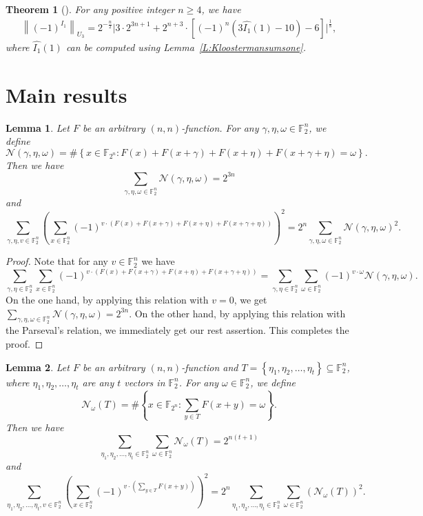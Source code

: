 \documentclass[12 pt]{article}
\newtheorem{theorem}{Theorem}
\newtheorem{lemma}{Lemma}
\def\F{{\mathbb F}}
\begin{document}
  \begin{theorem}[\cite{InverseFuncDAM2021}]\label{T:FFTSolution}
  For any positive integer {$n\geq 4$}, we have
  \begin{eqnarray*}
  \left\| (-1)^{I_1}\right\| _{U_3}=2^{-{\frac n2}}\bigg|3\cdot2^{3n+1}+2^{n+3}\cdot\left[(-1)^n\left(3\widehat{I_1}(1)-10\right)-6\right]\bigg|^{\frac 18},
  \end{eqnarray*}
  where $\widehat{I_1}(1)$ can be computed using Lemma~\ref{L:Kloostermansumsone}.
  \end{theorem}
\section{Main results}
  \begin{lemma}\label{L:SumSqur}
  Let $F$ be an arbitrary $(n, n)$-function. For any $\gamma,\eta,\omega\in\F_2^n$, we define
  \[\mathcal{N}(\gamma,\eta,\omega)=\#\left\{x\in\F_{2^n} : F(x)+F(x+\gamma)+F(x+\eta)+F(x+\gamma+\eta)=\omega\right\}.\]
  Then we have
  \[\sum_{\gamma,\eta,\omega\in\F_2^n}\mathcal{N}(\gamma,\eta,\omega)=2^{3n}\]
  and
  \[\sum_{\gamma,\eta,v \in\F_2^n}\left(\sum_{x\in\F_2^n}(-1)^{v\cdot\left(F(x)+F(x+\gamma)+F(x+\eta)+F(x+\gamma+\eta)\right)}\right)^2=2^n\sum_{\gamma,\eta,\omega\in\F_2^n}\mathcal{N}(\gamma,\eta,\omega)^2.\]
  \end{lemma}
  \begin{proof}
  Note that for any $v\in\F_2^n$ we have $$\sum_{\gamma,\eta\in\F_2^n}\sum_{x \in \F_2^n}(-1)^{v \cdot(F(x)+F(x+\gamma)+F(x+\eta)+F(x+\gamma+\eta))} =\sum_{\gamma,\eta\in\F_2^n}\sum_{\omega \in \F_2^n}(-1)^{v \cdot \omega}\mathcal{N}(\gamma,\eta,\omega).$$
  On the one hand, by applying this relation with $v=0$, we get  $\sum_{\gamma,\eta,\omega\in\F_2^n}\mathcal{N}(\gamma,\eta,\omega)=2^{3n}$.  On the other hand,
  by applying this relation with the Parseval's relation, we immediately get our rest assertion. This completes the proof.
  \end{proof}

  \begin{lemma}\label{L:SumSqurNew}
    Let $F$ be an arbitrary $(n, n)$-function and $T=\left\{\eta_1,\eta_2,\ldots,\eta_t\right\}\subseteq\F_2^n$, 
    where $\eta_1, \eta_2, \ldots, \eta_t$ are any $t$ vectors in $\F_2^n$.
    For any $\omega\in\F_2^n$, we define
    \[\mathcal{N}_\omega(T)=\#\left\{x\in\F_{2^n} : \sum_{y\in T}F(x+y)=\omega\right\}.\]
    Then we have
    \[ \sum_{\eta_1,\eta_2,\ldots,\eta_t\in\F_2^n}\sum_{\omega\in\F_2^n}\mathcal{N}_\omega(T)=2^{n(t+1)}\]
    and
    \begin{equation*}
      \sum_{\eta_1,\eta_2,\ldots,\eta_t,v\in\F_2^n}\left(\sum_{x\in\F_2^n}(-1)^{v\cdot\left(\sum_{y\in T}F(x+y)\right)}\right)^2=2^n\sum_{\eta_1,\eta_2,\ldots,\eta_t\in\F_2^n}\sum_{\omega\in\F_2^n}\left( \mathcal{N}_{\omega}(T) \right)^2.
    \end{equation*}
  \end{lemma}
\end{document}
